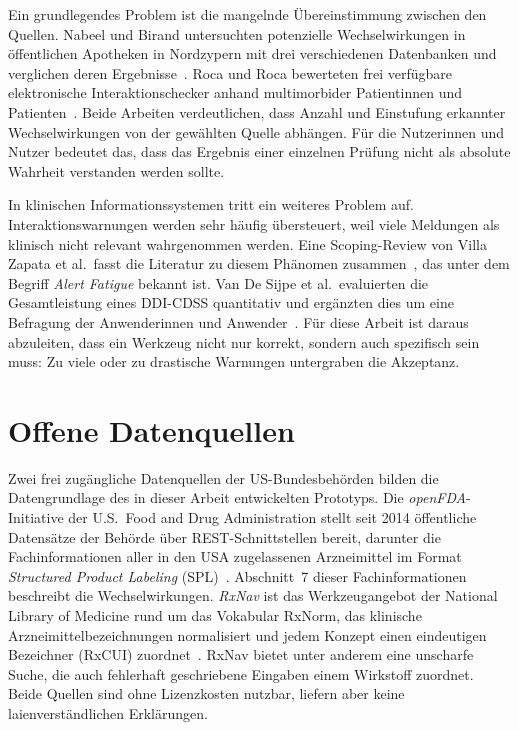 Ein grundlegendes Problem ist die mangelnde Übereinstimmung zwischen den Quellen. Nabeel und Birand untersuchten potenzielle Wechselwirkungen in öffentlichen Apotheken in Nordzypern mit drei verschiedenen Datenbanken und verglichen deren Ergebnisse~\cite{article}. Roca und Roca bewerteten frei verfügbare elektronische Interaktionschecker anhand multimorbider Patientinnen und Patienten~\cite{Roca2022}. Beide Arbeiten verdeutlichen, dass Anzahl und Einstufung erkannter Wechselwirkungen von der gewählten Quelle abhängen. Für die Nutzerinnen und Nutzer bedeutet das, dass das Ergebnis einer einzelnen Prüfung nicht als absolute Wahrheit verstanden werden sollte.

In klinischen Informationssystemen tritt ein weiteres Problem auf. Interaktionswarnungen werden sehr häufig übersteuert, weil viele Meldungen als klinisch nicht relevant wahrgenommen werden. Eine Scoping-Review von Villa Zapata et al.\ fasst die Literatur zu diesem Phänomen zusammen~\cite{VillaZapata}, das unter dem Begriff \emph{Alert Fatigue} bekannt ist. Van De Sijpe et al.\ evaluierten die Gesamtleistung eines DDI-CDSS quantitativ und ergänzten dies um eine Befragung der Anwenderinnen und Anwender~\cite{VanDeSijpe}. Für diese Arbeit ist daraus abzuleiten, dass ein Werkzeug nicht nur korrekt, sondern auch spezifisch sein muss: Zu viele oder zu drastische Warnungen untergraben die Akzeptanz.

\section{Offene Datenquellen}

Zwei frei zugängliche Datenquellen der US-Bundesbehörden bilden die Datengrundlage des in dieser Arbeit entwickelten Prototyps. Die \emph{openFDA}-Initiative der U.S.\ Food and Drug Administration stellt seit 2014 öffentliche Datensätze der Behörde über REST-Schnittstellen bereit, darunter die Fachinformationen aller in den USA zugelassenen Arzneimittel im Format \emph{Structured Product Labeling} (SPL)~\cite{openFDA}. Abschnitt~7 dieser Fachinformationen beschreibt die Wechselwirkungen. \emph{RxNav} ist das Werkzeugangebot der National Library of Medicine rund um das Vokabular RxNorm, das klinische Arzneimittelbezeichnungen normalisiert und jedem Konzept einen eindeutigen Bezeichner (RxCUI) zuordnet~\cite{RxNav}. RxNav bietet unter anderem eine unscharfe Suche, die auch fehlerhaft geschriebene Eingaben einem Wirkstoff zuordnet. Beide Quellen sind ohne Lizenzkosten nutzbar, liefern aber keine laienverständlichen Erklärungen.

